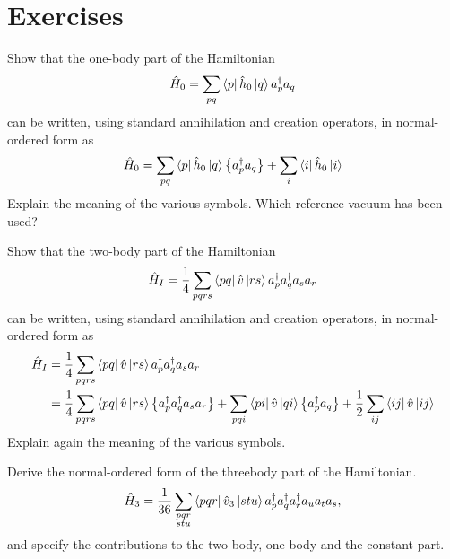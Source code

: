   \section{Exercises}
  \begin{prob} \label{problem:prob8.1}
  Show that the one-body part of the Hamiltonian
      \begin{equation*}
          \hat{H}_0 = \sum_{pq} \bra{p}\hat{h}_0\ket{q} a^\dagger_p
          a_q
      \end{equation*}
  can be written, using standard annihilation and creation operators,
  in normal-ordered form as
      \[
          \hat{H}_0 = \sum_{pq} \bra{p}\hat{h}_0\ket{q}
          \left\{a^\dagger_p a_q\right\} + \sum_i
          \bra{i}\hat{h}_0\ket{i}
      \]
  Explain the meaning of the various symbols. Which reference vacuum
  has been used?
  \end{prob}


  \begin{prob} \label{problem:prob8.2}
  Show that the two-body part of the Hamiltonian
      \begin{equation*}
          \hat{H}_I = \frac{1}{4} \sum_{pqrs}
          \bra{pq}\hat{v}\ket{rs} a^\dagger_p a^\dagger_q a_s a_r
      \end{equation*}
  can be written, using standard annihilation and creation operators,
  in normal-ordered form as
      \begin{align*}
      \hat{H}_I &= \frac{1}{4} \sum_{pqrs} \bra{pq}\hat{v}\ket{rs}
      a^\dagger_p a^\dagger_q a_s a_r \nonumber \\ &= \frac{1}{4}
      \sum_{pqrs} \bra{pq}\hat{v}\ket{rs} \left\{a^\dagger_p
        a^\dagger_q a_s a_r\right\} + \sum_{pqi} \bra{pi}\hat{v}\ket{qi}
      \left\{a^\dagger_p a_q\right\} + \frac{1}{2} \sum_{ij}
      \bra{ij}\hat{v}\ket{ij}
      \end{align*}
  Explain again the meaning of the various symbols.
  \end{prob}



  \begin{prob}\label{problem:prob8.3}
  Derive the normal-ordered form of the threebody part of the
  Hamiltonian.
  \[
      \hat{H}_3 = \frac{1}{36} \sum_{\substack{ pqr \\ stu}}
      \bra{pqr}\hat{v}_3\ket{stu} a^\dagger_p a^\dagger_q
      a^\dagger_r a_u a_t a_s,
  \]
  and specify the contributions to the two-body, one-body and the
  constant part.
  \end{prob}



